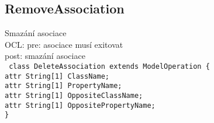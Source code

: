 \documentclass[11pt,a4paper]{article}
\begin{document}
	\subsection{RemoveAssociation}
	Smazání asociace \\
	OCL: pre: asociace musí exitovat \\
	post: smazání asociace \\
	\texttt{
    class DeleteAssociation extends ModelOperation \{ \\
      attr String[1] ClassName; \\
      attr String[1] PropertyName; \\
      attr String[1] OppositeClassName; \\
      attr String[1] OppositePropertyName; \\
    \}
	}								
\end{document}
